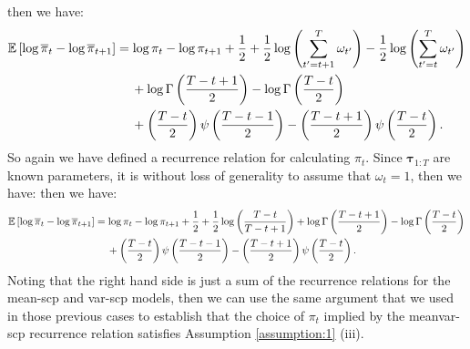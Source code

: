 then we have:
\small
\begin{align*}
    \mathbb{E}\left[\log\overline{\pi}_t - \log \overline{\pi}_{t+1} \right] &= \log \pi_t- \log \pi_{t+1} + \frac{1}{2} + \frac{1}{2}\log\left(\sum_{t'=t+1}^T \omega_{t'}\right) - \frac{1}{2}\log\left(\sum_{t'=t}^T \omega_{t'}\right) \\
    &\quad \:+ \log \Gamma\left(\frac{ T-t+1}{2}\right) - \log \Gamma\left(\frac{T-t}{2}\right)  \\
    &\quad \: + \left(\frac{T - t}{2}\right)\psi\left(\frac{T-t-1}{2}\right) - \left(\frac{T - t +1}{2}\right)\psi\left(\frac{T-t}{2}\right).
\end{align*}
\normalsize
So again we have defined a recurrence relation for calculating $\pi_t$. Since $\boldsymbol{\tau}_{1:T}$ are known parameters, it is without loss of generality to assume that $\omega_t = 1$, then we have:   
then we have:
\small
\begin{align*}
    \mathbb{E}\left[\log\overline{\pi}_t - \log \overline{\pi}_{t+1} \right] &= \log \pi_t- \log \pi_{t+1} + \frac{1}{2} + \frac{1}{2}\log\left(\frac{T-t}{T-t+1}\right) + \log \Gamma\left(\frac{ T-t+1}{2}\right) - \log \Gamma\left(\frac{T-t}{2}\right)  \\
    &\quad \: + \left(\frac{T - t}{2}\right)\psi\left(\frac{T-t-1}{2}\right) - \left(\frac{T - t +1}{2}\right)\psi\left(\frac{T-t}{2}\right).
\end{align*}
\normalsize
Noting that the right hand side is just a sum of the recurrence relations for the mean-scp and var-scp models, then we can use the same argument that we used in those previous cases to establish that the choice of $\pi_t$ implied by the meanvar-scp recurrence relation satisfies Assumption \ref{assumption:1} (iii).

\normalsize